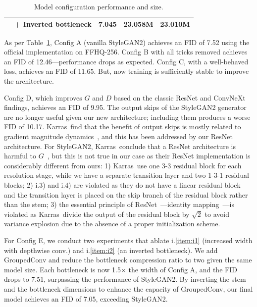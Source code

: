 \begin{table}[t]
{\begin{tabular}{ l r c c c }
   & \textcolor[rgb]{0,0.502,0.502}{+ Inverted bottleneck}                                                                                                                                         & 7.045 & 23.058M & 23.010M  \\ 
\bottomrule
\end{tabular}
}
\vspace{-0.25cm}
\caption{Model configuration performance and size.} 
\label{tab:roadmap}
\vspace{-1ex}
\end{table}

As per Table~\ref{tab:roadmap}, Config A (vanilla StyleGAN2) achieves an FID of 7.52 using the official implementation on FFHQ-256. Config B with all tricks removed achieves an FID of 12.46---performance drops as expected. 
Config C, with a well-behaved loss, achieves an FID of 11.65. But, now training is sufficiently stable to improve the architecture.

Config D, which improves $G$ and $D$ based on the classic ResNet and ConvNeXt findings, achieves an FID of 9.95. The output skips of the StyleGAN2 generator are no longer useful given our new architecture; including them produces a worse FID of 10.17. Karras~\etal find that the benefit of output skips is mostly related to gradient magnitude dynamics~\cite{sg3}, and this has been addressed by our ResNet architecture. For StyleGAN2, Karras~\etal conclude that a ResNet architecture is harmful to $G$~\cite{sg2}, but this is not true in our case as their ResNet implementation is considerably different from ours: 1) Karras~\etal use one 3-3 residual block for each resolution stage, while we have a separate transition layer and two 1-3-1 residual blocks; 2) i.3) and i.4) are violated as they do not have a linear residual block~\cite{mobnet} and the transition layer is placed on the skip branch of the residual block rather than the stem; 3) the essential principle of ResNet~\cite{resnet}---identity mapping~\cite{resnet2}---is violated as Karras~\etal divide the output of the residual block by $\sqrt{2}$ to avoid variance explosion due to the absence of a proper initialization scheme.

For Config E, we conduct two experiments that ablate i.\ref{item:i1} (increased width with depthwise conv.) and i.\ref{item:i2} (an inverted bottleneck). We add GroupedConv and reduce the bottleneck compression ratio to two given the same model size. Each bottleneck is now 1.5$\times$ the width of Config A, and the FID drops to 7.51, surpassing the performance of StyleGAN2. By inverting the stem and the bottleneck dimensions to enhance the capacity of GroupedConv, our final model achieves an FID of 7.05, exceeding StyleGAN2.

